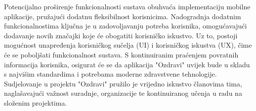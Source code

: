 		 Potencijalno proširenje funkcionalnosti sustava obuhvaća implementaciju mobilne aplikacije, pružajući dodatnu fleksibilnost korisnicima. Nadogradnja dodatnim funkcionalnostima ključna je u zadovoljavanju potreba korisnika, omogućavajući dodavanje novih značajki koje će obogatiti korisničko iskustvo. Uz to, postoji mogućnost unapređenja korisničkog sučelja (UI) i korisničkog iskustva (UX), čime će se poboljšati funkcionalnost sustava. S kontinuiranim praćenjem povratnih informacija korisnika, osigurat će se da aplikacija "Ozdravi" uvijek bude u skladu s najvišim standardima i potrebama moderne zdravstvene tehnologije. \\
		 Sudjelovanje u projektu "Ozdravi" pružilo je vrijedno iskustvo članovima tima, naglašavajući važnost suradnje, organizacije te kontinuiranog učenja u radu na složenim projektima.
		\eject 